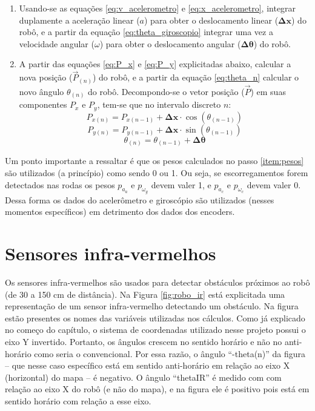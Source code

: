 \begin{enumerate}
  \item Usando-se as equações \ref{eq:v_acelerometro} e \ref{eq:x_acelerometro}, integrar duplamente a aceleração linear ($a$) para obter o deslocamento linear ($\bm{\Delta x}$) do robô, e a partir da equação \ref{eq:theta_giroscopio} integrar uma vez a velocidade angular ($\omega$) para obter o deslocamento angular ($\bm{\Delta \theta}$) do robô.
  
  \item A partir das equações \ref{eq:P_x} e \ref{eq:P_y} explicitadas abaixo, calcular a nova posição ($\overrightarrow{P}_{(n)}$) do robô, e a partir da equação \ref{eq:theta_n} calcular o novo ângulo $\theta_{(n)}$ do robô. Decompondo-se o vetor posição ($\overrightarrow{P}$) em suas componentes $P_x$ e $P_y$, tem-se que no intervalo discreto $n$:
    \begin{equation}
      P_{x (n)} = P_{x (n-1)} + \bm{\Delta x} \cdot \cos{(\theta_{(n-1)})}
      \label{eq:P_x}
    \end{equation}
    \begin{equation}
      P_{y (n)} = P_{y (n-1)} + \bm{\Delta x} \cdot \sin{(\theta_{(n-1)})}
      \label{eq:P_y}
    \end{equation}
    \begin{equation}
      \theta_{(n)} = \theta_{(n-1)} + \bm{\Delta \theta}
      \label{eq:theta_n}
    \end{equation}
\end{enumerate}

Um ponto importante a ressaltar é que os pesos calculados no passo \ref{item:pesos} são utilizados (a princípio) como sendo 0 ou 1. Ou seja, se escorregamentos forem detectados nas rodas os pesos $p_{a_a}$ e $p_{\omega_g}$ devem valer 1, e $p_{a_c}$ e $p_{\omega_c}$ devem valer 0. Dessa forma os dados do acelerômetro e giroscópio são utilizados (nesses momentos específicos) em detrimento dos dados dos encoders.


\section{Sensores infra-vermelhos}

Os sensores infra-vermelhos são usados para detectar obstáculos próximos ao robô (de 30 a 150 cm de distância). Na Figura \ref{fig:robo_ir} está explicitada uma representação de um sensor infra-vermelho detectando um obstáculo. Na figura estão presentes os nomes das variáveis utilizadas nos cálculos. Como já explicado no começo do capítulo, o sistema de coordenadas utilizado nesse projeto possui o eixo Y invertido. Portanto, os ângulos crescem no sentido horário e não no anti-horário como seria o convencional. Por essa razão, o ângulo ``-theta(n)'' da figura -- que nesse caso específico está em sentido anti-horário em relação ao eixo X (horizontal) do mapa -- é negativo. O ângulo ``thetaIR'' é medido com com relação ao eixo X do robô (e não do mapa), e na figura ele é positivo pois está em sentido horário com relação a esse eixo.

